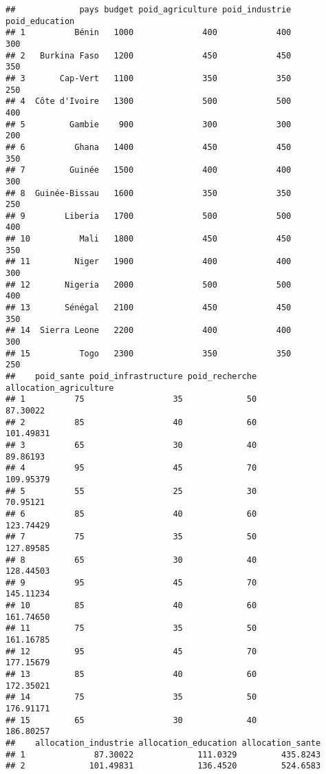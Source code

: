 \documentclass[
]{article}
\begin{document}
\begin{verbatim}
##             pays budget poid_agriculture poid_industrie poid_education
## 1          Bénin   1000              400            400            300
## 2   Burkina Faso   1200              450            450            350
## 3       Cap-Vert   1100              350            350            250
## 4  Côte d'Ivoire   1300              500            500            400
## 5         Gambie    900              300            300            200
## 6          Ghana   1400              450            450            350
## 7         Guinée   1500              400            400            300
## 8  Guinée-Bissau   1600              350            350            250
## 9        Liberia   1700              500            500            400
## 10          Mali   1800              450            450            350
## 11         Niger   1900              400            400            300
## 12       Nigeria   2000              500            500            400
## 13       Sénégal   2100              450            450            350
## 14  Sierra Leone   2200              400            400            300
## 15          Togo   2300              350            350            250
##    poid_sante poid_infrastructure poid_recherche allocation_agriculture
## 1          75                  35             50               87.30022
## 2          85                  40             60              101.49831
## 3          65                  30             40               89.86193
## 4          95                  45             70              109.95379
## 5          55                  25             30               70.95121
## 6          85                  40             60              123.74429
## 7          75                  35             50              127.89585
## 8          65                  30             40              128.44503
## 9          95                  45             70              145.11234
## 10         85                  40             60              161.74650
## 11         75                  35             50              161.16785
## 12         95                  45             70              177.15679
## 13         85                  40             60              172.35021
## 14         75                  35             50              176.91171
## 15         65                  30             40              186.80257
##    allocation_industrie allocation_education allocation_sante
## 1              87.30022             111.0329         435.8243
## 2             101.49831             136.4520         524.6583

\end{verbatim}
\end{document}
